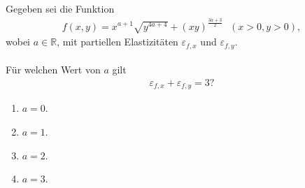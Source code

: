\subsection*{}
Gegeben sei die Funktion
\begin{align*}
f(x,y) = 
x^{a+1} \sqrt{y^{4a + 4 }}+ ( xy)^{\frac{3a + 3}{2}} \ \ \ (x > 0, y > 0),
\end{align*}
wobei $ a \in \mathbb{R} $, mit partiellen Elastizitäten $ \varepsilon_{f,x} $ und $ \varepsilon_{f,y} $.\\
\\
Für welchen Wert von $ a $ gilt
\begin{align*}
\varepsilon_{f,x} + \varepsilon_{f,y} = 3?
\end{align*}
\renewcommand{\labelenumi}{(\alph{enumi})}
\begin{enumerate}
\item 
$a = 0$.
\item
$a = 1$.
\item
$a = 2$.
\item
$a = 3$.
\end{enumerate}